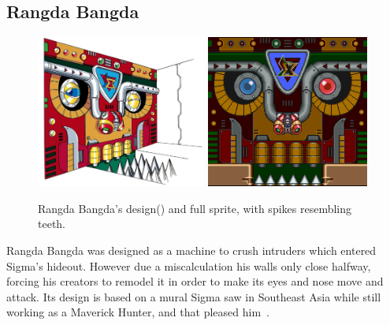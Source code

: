 \subsection{Rangda Bangda}\label{boss:Rangda_bangda}
\begin{figure}[htp]
	\centering
	\includegraphics[height=5cm]{figures/X1/Sigma_stages/RangdaBangda.jpg}
	\includegraphics[height=5cm]{figures/X1/Sigma_stages/Rangdabangdasprite.png}
	\caption{Rangda Bangda's design(\cite{book:MMX_Complete_art}) and full sprite, with spikes resembling teeth.}
\end{figure}
Rangda Bangda was designed as a machine to crush intruders which entered Sigma's hideout. However due a miscalculation his walls only close halfway, forcing his creators to remodel it in order to make its eyes and nose move and attack. Its design is based on a mural Sigma saw in Southeast Asia while still working as a Maverick Hunter, and that pleased him~\cite{wayback:X_resources}.


